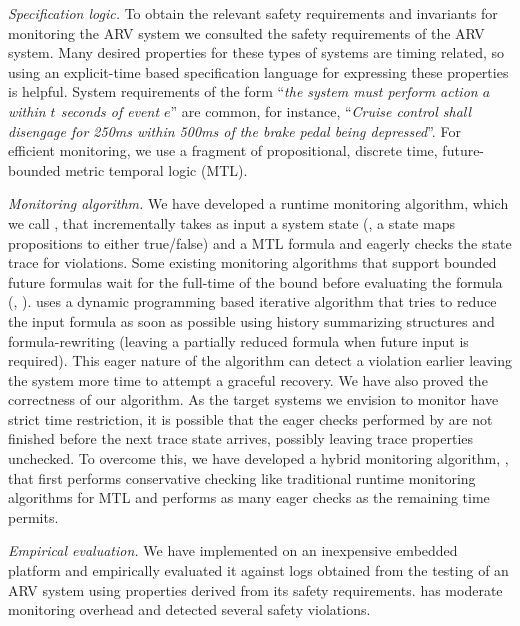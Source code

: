 \noindent
\textit{Specification logic.}
To obtain the relevant safety requirements and invariants for monitoring the ARV system we consulted the safety requirements of the ARV system.
Many desired properties for these types of systems are timing related, so using an explicit-time based specification language for expressing these properties is helpful.
System requirements of the form ``\emph{the system must perform action $a$ within $t$ seconds of event $e$}'' are common, for instance, ``\emph{Cruise control shall disengage for 250ms within 500ms of the brake pedal being depressed}''.
%
For efficient monitoring, we use a fragment of propositional, discrete time, future-bounded metric temporal logic (MTL)\cite{Koymans1990}.

\noindent
\textit{Monitoring algorithm.}
We have developed a runtime monitoring algorithm, which we call \monitor, that incrementally takes as input a system state
(\ie, a state maps  propositions to either true/false) and a MTL formula and eagerly checks the state trace for violations.
Some existing monitoring algorithms that support bounded future formulas wait for the full-time of the bound before evaluating the formula (\eg, \cite{Basin2008}).
\monitor uses a dynamic programming based iterative algorithm that tries to reduce the input formula as soon as possible using history summarizing structures and formula-rewriting (leaving a partially reduced formula when future input is required).
This eager nature of the algorithm can detect a violation earlier leaving the system more time to attempt a graceful recovery.
We have also proved the correctness of our algorithm. As the target systems we envision to monitor
have strict time restriction,
it is possible that the eager checks performed by \monitor are not finished before the next trace state arrives, possibly leaving trace properties unchecked. 
To overcome this, we have developed a hybrid monitoring algorithm, \ha, that first performs conservative checking like traditional runtime monitoring algorithms for MTL and performs as many eager checks as the remaining time permits.

\noindent
\textit{Empirical evaluation.}
We have implemented \monitor on an inexpensive embedded platform and empirically evaluated it against logs obtained from the testing of an ARV system using properties derived from its safety requirements.
\monitor has moderate monitoring overhead and detected several safety violations.


